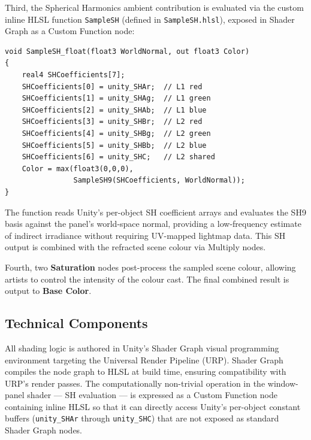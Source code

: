 \documentclass[12pt]{article}
\begin{document}
Third, the Spherical Harmonics ambient contribution is evaluated via the custom inline HLSL function \texttt{SampleSH} (defined in \texttt{SampleSH.hlsl}), exposed in Shader Graph as a Custom Function node:

\begin{verbatim}
void SampleSH_float(float3 WorldNormal, out float3 Color)
{
    real4 SHCoefficients[7];
    SHCoefficients[0] = unity_SHAr;  // L1 red
    SHCoefficients[1] = unity_SHAg;  // L1 green
    SHCoefficients[2] = unity_SHAb;  // L1 blue
    SHCoefficients[3] = unity_SHBr;  // L2 red
    SHCoefficients[4] = unity_SHBg;  // L2 green
    SHCoefficients[5] = unity_SHBb;  // L2 blue
    SHCoefficients[6] = unity_SHC;   // L2 shared
    Color = max(float3(0,0,0),
                SampleSH9(SHCoefficients, WorldNormal));
}
\end{verbatim}

The function reads Unity's per-object SH coefficient arrays and evaluates the SH9 basis against the panel's world-space normal, providing a low-frequency estimate of indirect irradiance without requiring UV-mapped lightmap data. This SH output is combined with the refracted scene colour via Multiply nodes.

Fourth, two \textbf{Saturation} nodes post-process the sampled scene colour, allowing artists to control the intensity of the colour cast. The final combined result is output to \textbf{Base Color}.


\subsection{Technical Components}
\label{subsec:technical-components}

All shading logic is authored in Unity's Shader Graph visual programming environment targeting the Universal Render Pipeline (URP). Shader Graph compiles the node graph to HLSL at build time, ensuring compatibility with URP's render passes. The computationally non-trivial operation in the window-panel shader --- SH evaluation --- is expressed as a Custom Function node containing inline HLSL so that it can directly access Unity's per-object constant buffers (\texttt{unity\_SHAr} through \texttt{unity\_SHC}) that are not exposed as standard Shader Graph nodes.
\end{document}
